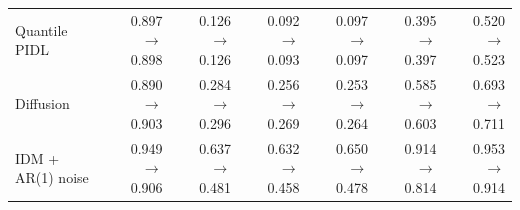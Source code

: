 \begin{table}[htbp]
\begin{tabular}{lrrrrrr}
Quantile PIDL & 0.897 $\rightarrow$ 0.898 & 0.126 $\rightarrow$ 0.126 & 0.092 $\rightarrow$ 0.093 & 0.097 $\rightarrow$ 0.097 & 0.395 $\rightarrow$ 0.397 & 0.520 $\rightarrow$ 0.523 \\
Diffusion & 0.890 $\rightarrow$ 0.903 & 0.284 $\rightarrow$ 0.296 & 0.256 $\rightarrow$ 0.269 & 0.253 $\rightarrow$ 0.264 & 0.585 $\rightarrow$ 0.603 & 0.693 $\rightarrow$ 0.711 \\
IDM + AR(1) noise & 0.949 $\rightarrow$ 0.906 & 0.637 $\rightarrow$ 0.481 & 0.632 $\rightarrow$ 0.458 & 0.650 $\rightarrow$ 0.478 & 0.914 $\rightarrow$ 0.814 & 0.953 $\rightarrow$ 0.914 \\
\bottomrule
\end{tabular}
\end{table}
